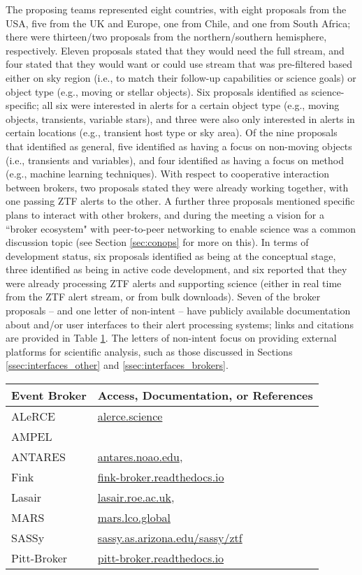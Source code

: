 The proposing teams represented eight countries, with eight proposals from the  {USA}, five from the  {UK} and Europe, one from Chile, and one from South Africa; there were thirteen/two proposals from the northern/southern hemisphere, respectively.
Eleven proposals stated that they would need the full stream, and four stated that they would want or could use stream that was pre-filtered based either on sky region (i.e., to match their follow-up capabilities or science goals) or object type (e.g., moving or stellar objects).
Six proposals identified as science-specific; all six were interested in alerts for a certain object type (e.g., moving objects, transients, variable stars), and three were also only interested in alerts in certain locations (e.g.,  {transient} host type or sky area).
Of the nine proposals that identified as general, five identified as having a focus on non-moving objects (i.e., transients and variables), and four identified as having a focus on method (e.g., machine learning techniques).
With respect to cooperative interaction between brokers, two proposals stated they were already working together, with one passing  {ZTF} alerts to the other.
A further three proposals mentioned specific plans to interact with other brokers, and during the meeting a vision for a ``broker ecosystem" with peer-to-peer networking to enable science was a common discussion topic (see Section \ref{sec:conops} for more on this).
In terms of development status, six proposals identified as being at the conceptual stage, three identified as being in active code development, and six reported that they were already processing  {ZTF} alerts and supporting science (either in real time from the  {ZTF} alert stream, or from bulk downloads). 
Seven of the broker proposals -- and one letter of non-intent -- have publicly available documentation about and/or user interfaces to their alert processing systems; links and citations are provided in Table \ref{tab:brokers}.
The letters of non-intent focus on providing external platforms for scientific analysis, such as those discussed in Sections \ref{ssec:interfaces_other} and \ref{ssec:interfaces_brokers}.

\begin{table}[h!]
\label{tab:brokers}
\centering
 \begin{tabular}{ll} 
 \hline
 Event  {Broker} & Access, Documentation, or References \\
 \hline\hline
 ALeRCE & \url{alerce.science} \\
  {AMPEL} & \protect{\citet{ampel}} \\
  {ANTARES} & \url{antares.noao.edu},\ \protect{\citet{2016SPIE.9910E..0FS}}\\
 Fink & \url{fink-broker.readthedocs.io} \\
 Lasair & \url{lasair.roe.ac.uk},\ \protect{\citet{2019RNAAS...3...26S}} \\
  {MARS} & \url{mars.lco.global} \\
 SASSy & \url{sassy.as.arizona.edu/sassy/ztf} \\
 Pitt-Broker & \url{pitt-broker.readthedocs.io} \\
 \hline
 \end{tabular}
\end{table}

